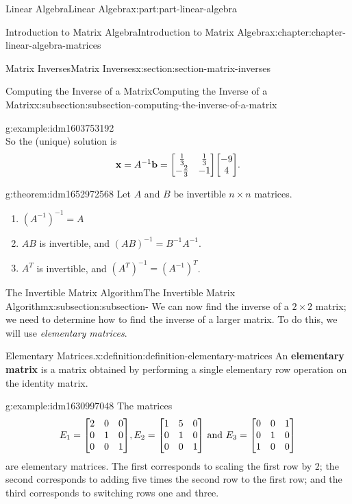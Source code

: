 \documentclass[twoside,10pt,]{book}
\newcommand{\terminology}[1]{\textbf{#1}}
\numberwithin{equation}{part}
\providecommand{\vb}[1]{\mathbf{#1}}
\begin{document}
\begin{partptx}{Linear Algebra}{}{Linear Algebra}{}{}{x:part:part-linear-algebra}
\begin{chapterptx}{Introduction to Matrix Algebra}{}{Introduction to Matrix Algebra}{}{}{x:chapter:chapter-linear-algebra-matrices}
\begin{sectionptx}{Matrix Inverses}{}{Matrix Inverses}{}{}{x:section:section-matrix-inverses}
\begin{subsectionptx}{Computing the Inverse of a Matrix}{}{Computing the Inverse of a Matrix}{}{}{x:subsection:subsection-computing-the-inverse-of-a-matrix}
\begin{example}{}{g:example:idm1603753192}
\begin{equation*}
\end{equation*}
So the (unique) solution is%
\begin{equation*}
\vb{x} = A^{-1}\vb{b} = \mqty[\frac{1}{3} & \frac{1}{3} \\ -\frac{2}{3} & -1 ]\mqty[-9 \\ 4].
\end{equation*}
%
\end{example}
\begin{theorem}{}{}{g:theorem:idm1652972568}%
Let \(A\) and \(B\) be invertible \(n\times n\) matrices.%
\begin{enumerate}
\item{}\(\displaystyle (A^{-1})^{-1} = A\)%
\item{}\(AB\) is invertible, and \((AB)^{-1} = B^{-1}A^{-1}\).%
\item{}\(A^{T}\) is invertible, and \((A^{T})^{-1} = (A^{-1})^{T}\).%
\end{enumerate}
%
\end{theorem}
\end{subsectionptx}
%
%
\typeout{************************************************}
\typeout{************************************************}
%
\begin{subsectionptx}{The Invertible Matrix Algorithm}{}{The Invertible Matrix Algorithm}{}{}{x:subsection:subsection-}
We can now find the inverse of a \(2\times2\) matrix; we need to determine how to find the inverse of a larger matrix. To do this, we will use \emph{elementary matrices}.%
\begin{definition}{Elementary Matrices.}{x:definition:definition-elementary-matrices}%
An \terminology{elementary matrix} is a matrix obtained by performing a single elementary row operation on the identity matrix.%
\end{definition}
\begin{example}{}{g:example:idm1630997048}%
The matrices%
\begin{equation*}
E_{1} = \mqty[2 & 0 & 0 \\ 0 & 1 & 0 \\ 0 & 0 & 1],E_{2} = \mqty[1 & 5 & 0 \\ 0 & 1 & 0 \\ 0 & 0 & 1]\text{ and } E_{3} = \mqty[0 & 0 & 1 \\ 0 & 1 & 0 \\ 1 & 0 & 0]
\end{equation*}
are elementary matrices. The first corresponds to scaling the first row by \(2\); the second corresponds to adding five times the second row to the first row; and the third corresponds to switching rows one and three.%

\end{example}
\end{subsectionptx}
\end{sectionptx}
\end{chapterptx}
\end{partptx}
\end{document}
